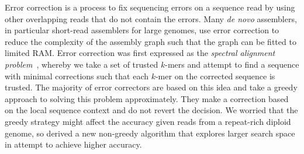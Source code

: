 \documentclass{bioinfo}
\begin{document}
Error correction is a process to fix sequencing errors on a sequence read
by using other overlapping reads that do not contain the errors. Many \emph{de
novo} assemblers, in particular short-read assemblers for large genomes, use
error correction to reduce the complexity of the assembly graph such that the
graph can be fitted to limited RAM. Error correction was first expressed
as the \emph{spectral alignment problem}~\citep{Pevzner:2001vn}, whereby we take
a set of trusted $k$-mers and attempt to find a sequence with minimal
corrections such that each $k$-mer on the corrected sequence is trusted.
The majority of error correctors are based on this idea and take a greedy
approach to solving this problem approximately. They make a correction based on
the local sequence context and do not revert the decision. We worried that the
greedy strategy might affect the accuracy given reads from a repeat-rich
diploid genome, so derived a new non-greedy algorithm that explores larger
search space in attempt to achieve higher accuracy.

\vspace{-1em}
\end{document}
